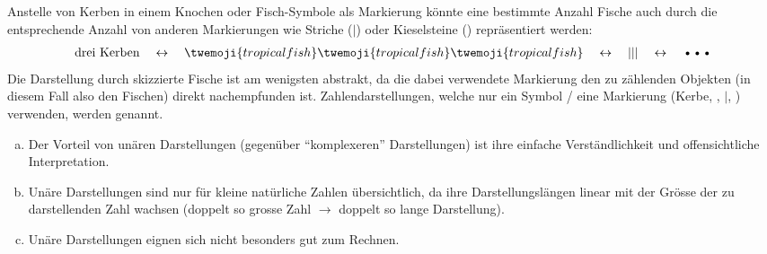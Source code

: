 Anstelle von Kerben in einem Knochen oder Fisch-Symbole als Markierung könnte eine bestimmte Anzahl Fische auch durch
die entsprechende Anzahl von anderen Markierungen wie Striche ($|$) oder Kieselsteine (\textbullet) repräsentiert werden:
\begin{align*}
	\text{drei Kerben} \quad\leftrightarrow\quad \twemoji{tropical fish}\twemoji{tropical fish}\twemoji{tropical fish} \quad\leftrightarrow\quad |||
	\quad\leftrightarrow\quad \text{\textbullet\textbullet\textbullet}
\end{align*}
Die Darstellung durch skizzierte Fische ist am wenigsten abstrakt, da die dabei verwendete Markierung den zu zählenden Objekten (in diesem Fall also den Fischen) direkt nachempfunden ist.
Zahlendarstellungen, welche nur ein Symbol / eine Markierung (Kerbe, , $|$, \textbullet) verwenden, werden
 genannt.

\begin{myremark}\leavevmode
	\begin{enumerate}[(a)]
		\item Der Vorteil von unären Darstellungen (gegenüber \enquote{komplexeren} Darstellungen) ist ihre einfache Verständlichkeit und
		      offensichtliche Interpretation.
		\item Unäre Darstellungen sind nur für kleine natürliche Zahlen übersichtlich, da ihre Darstellungslängen linear mit der Grösse der zu
		      darstellenden Zahl wachsen (doppelt so grosse Zahl $\rightarrow$ doppelt so lange Darstellung).
		\item Unäre Darstellungen eignen sich nicht besonders gut zum Rechnen.
	\end{enumerate}
\end{myremark}

